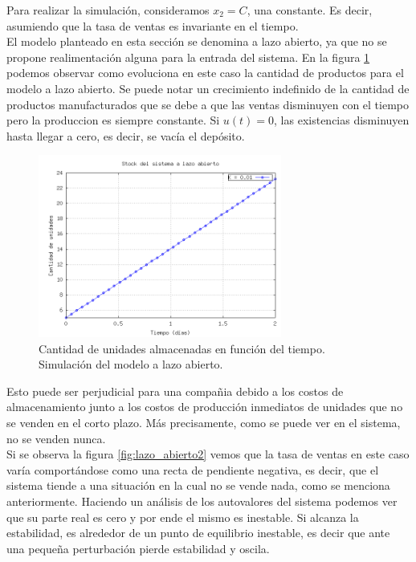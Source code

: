 \documentclass{sig-alternate}
\begin{document}
Para realizar la simulación, consideramos $x_{2} = C$, una constante. Es decir, asumiendo que la tasa de ventas es invariante en el tiempo.\\
El modelo planteado en esta sección se denomina a lazo abierto, ya que no se propone realimentación alguna para la entrada del sistema. 
En la figura \ref{fig:lazo_abierto} podemos observar como evoluciona en este caso la cantidad de productos para el modelo a lazo abierto. 
Se puede notar un crecimiento indefinido de la cantidad de productos manufacturados que se debe a que las ventas disminuyen con el tiempo pero la 
produccion es siempre constante. Si $u(t)=0$, las existencias disminuyen hasta llegar a cero, es decir, se vacía el depósito. 

\begin{figure}[h]
\begin{center}
\includegraphics[width=8cm]{../src/lazo_abierto.png}
\caption{\label{fig:lazo_abierto}Cantidad de unidades almacenadas en función del tiempo. Simulación del modelo a lazo abierto.}
\end{center}
\end{figure}
Esto puede ser perjudicial para una compañia debido a los costos de almacenamiento junto a los costos de producción inmediatos de unidades 
que no se venden en el corto plazo. Más precisamente, como se puede ver en el sistema, no se venden nunca.\\
Si se observa la figura \ref{fig:lazo_abierto2} vemos que la tasa de ventas en este caso varía comportándose como una recta de pendiente negativa, 
es decir, que el sistema tiende a una situación en la cual no se vende nada, como se menciona anteriormente. Haciendo un análisis de los autovalores 
del sistema podemos ver que su parte real es cero y por ende el mismo es inestable. Si alcanza la estabilidad, es alrededor de un punto de equilibrio 
inestable, es decir que ante una pequeña perturbación pierde estabilidad y oscila. 
\end{document}
